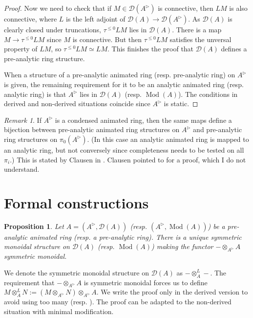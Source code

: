 \documentclass{article}
\theoremstyle{plain}
\newtheorem{prop}[thm]{Proposition}
\theoremstyle{definition}
\theoremstyle{remark}
\newtheorem{rmk}[thm]{Remark}
\DeclareMathOperator{\modcat}{Mod}
\newcommand{\dten}{\otimes ^{L}}
\newcommand{\huflag}{\triangleright}
\newcommand{\D}{\mathcal{D}}
\newcommand{\resp}[1]{{\color{respcolor}(resp. #1)}}
\begin{document}
\begin{proof}
Now we need to check that if $ M\in \D (A ^{\huflag}) $ is connective, then $ LM $ is also connective, where $ L $ is the left adjoint
of $ \D (A)\to \D (A ^{\huflag}) $.
As $ \D (A) $ is clearly closed under truncations, $ \tau ^{\leq 0} L M $ lies in $ \D (A) $.
There is a map $ M\to \tau ^{\leq 0}LM $ since $ M $ is connective.
But then $ \tau ^{\leq 0}LM $ satisfies the unversal property of $ LM $,
so $ \tau ^{\leq 0}LM\simeq LM $.
This finishes the proof that $ \D (A) $ defines a pre-analytic ring structure.

When a structure of a pre-analytic animated ring \resp{pre-analytic ring} on $ A ^{\huflag} $ is given,
the remaining requirement for it to be an analytic animated ring \resp{analytic ring} is that $ A ^{\huflag} $ lies in
$ \D (A) $ \resp{$ \modcat (A) $}. The conditions in derived and non-derived situations coincide since $ A ^{\huflag} $ is static.
\end{proof}

\begin{rmk}
If $ A ^{\huflag} $ is a condensed animated ring, then the same maps define a bijection between pre-analytic animated ring structures on
$ A ^{\huflag} $ and pre-analytic ring structures on $ \pi _{0}(A ^{\huflag}) $.
(In this case an analytic animated ring is mapped to an analytic ring, but not conversely since completeness needs to be tested on all $ \pi _{i} $.)
This is stated by Clausen in
\cite[\href{https://www.youtube.com/watch?v=38PzTzCiMow\&list=PLx5f8IelFRgGmu6gmL-Kf\_Rl\_6Mm7juZO\&index=13\&t=2099s}{Video 13, 34:59}]{ihesvid}.
Clausen pointed to \cite{analytic} for a proof, which I do not understand.
\label{definition::animated}
\end{rmk}

\section{Formal constructions}

\begin{prop}
Let $ A = (A ^{\huflag}, \D (A)) $ \resp{$ (A ^{\huflag}, \modcat (A)) $} be a pre-analytic animated ring \resp{a pre-analytic ring}.
There is a unique symmetric monoidal structure on $ \D (A) $ \resp{$ \modcat (A) $} making the functor $ -\otimes _{A ^{\huflag}} A $ symmetric monoidal.
\end{prop}

We denote the symmetric monoidal structure on $ \D (A) $ as $ -\dten _{A} - $.
The requirement that $ -\otimes _{A ^{\huflag}} A $ is symmetric monoidal forces us to define
$ M \dten _{A} N := (M \otimes _{A ^{\huflag}} N)\otimes _{A ^{\huflag}} A $.
We write the proof only in the derived version to avoid using too many \resp{}.
The proof can be adapted to the non-derived situation with minimal modification.
\end{document}
